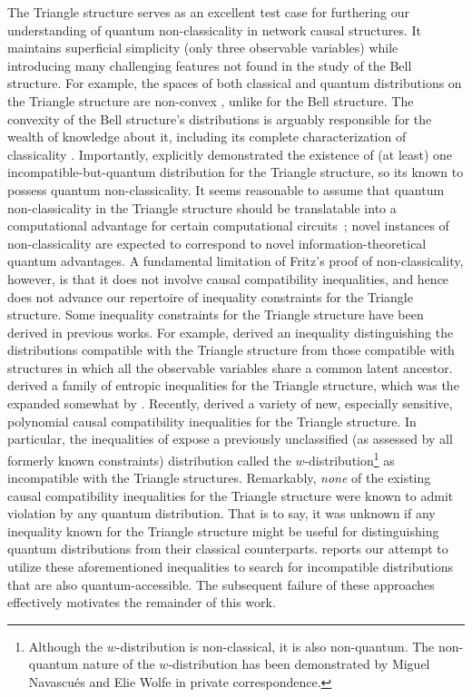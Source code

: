 \documentclass[aps, 10pt, english, twoside, pra, nofootinbib, tightenlines, longbibliography, superscriptaddress]{revtex4-1}
\begin{document}
    The Triangle structure serves as an excellent test case for furthering our understanding of quantum non-classicality in network causal structures. It maintains superficial simplicity (only three observable variables) while introducing many challenging features not found in the study of the Bell structure.
    For example, the spaces of both classical and quantum distributions on the Triangle structure are non-convex \cite{Fritz_2012,Inflation}, unlike for the Bell structure. The convexity of the Bell structure's distributions is arguably responsible for the wealth of knowledge about it, including its complete characterization of classicality \cite{Brunner_2013}.
    Importantly, \citet{Fritz_2012} explicitly demonstrated the existence of (at least) one incompatible-but-quantum distribution for the Triangle structure, so its known to possess quantum non-classicality. It seems reasonable to assume that quantum non-classicality in the Triangle structure should be translatable into a computational advantage for certain computational circuits~\cite{Terhal_2002}; novel instances of non-classicality are expected to correspond to novel information-theoretical quantum advantages. A fundamental limitation of Fritz's proof of non-classicality, however, is that it does not involve causal compatibility inequalities, and hence does not advance our repertoire of inequality constraints for the Triangle structure.
    Some inequality constraints for the Triangle structure have been derived in previous works. For example, \citet{Steudel_2010} derived an inequality distinguishing the distributions compatible with the Triangle structure from those compatible with structures in which all the observable variables share a common latent ancestor. \citet{Henson_2014} derived a family of entropic inequalities for the Triangle structure, which was the expanded somewhat by \citet{Weilenmann_2016}. Recently, \citet{Inflation} derived a variety of new, especially sensitive, polynomial causal compatibility inequalities for the Triangle structure. In particular, the inequalities of \cite{Inflation} expose a previously unclassified (as assessed by all formerly known constraints) distribution called the $w$-distribution\footnote{Although the $w$-distribution is non-classical, it is also non-quantum. The non-quantum nature of the $w$-distribution has been demonstrated by Miguel Navascués and Elie Wolfe in private correspondence.} as incompatible with the Triangle structures.
    Remarkably, \emph{none} of the existing causal compatibility inequalities for the Triangle structure were known to admit violation by any quantum distribution. That is to say, it was unknown if any inequality known for the Triangle structure might be useful for distinguishing quantum distributions from their classical counterparts.  reports our attempt to utilize these aforementioned inequalities to search for incompatible distributions that are also quantum-accessible. The subsequent failure of these approaches effectively motivates the remainder of this work.
\end{document}
